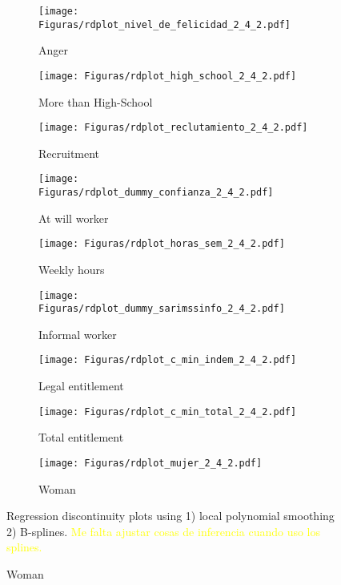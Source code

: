 \begin{figure}[H]
     \caption{RD plots (Calculator treatment; running variable : Tenure \& Daily wage)}
    \label{rd_covs_2_4_t2}
\begin{center}
\begin{subfigure}{0.31\textwidth}
\caption{Anger}
        \texttt{[image: Figuras/rdplot\_nivel\_de\_felicidad\_2\_4\_2.pdf]}
    \end{subfigure}
    \begin{subfigure}{0.31\textwidth}
\caption{More than High-School}
        \texttt{[image: Figuras/rdplot\_high\_school\_2\_4\_2.pdf]}
    \end{subfigure}
\begin{subfigure}{0.31\textwidth}
\caption{Recruitment}
        \texttt{[image: Figuras/rdplot\_reclutamiento\_2\_4\_2.pdf]}
    \end{subfigure}
    \begin{subfigure}{0.31\textwidth}
\caption{At will worker}
        \texttt{[image: Figuras/rdplot\_dummy\_confianza\_2\_4\_2.pdf]}
    \end{subfigure}        
    \begin{subfigure}{0.31\textwidth}
\caption{Weekly hours}
        \texttt{[image: Figuras/rdplot\_horas\_sem\_2\_4\_2.pdf]}
    \end{subfigure}    
    \begin{subfigure}{0.31\textwidth}
\caption{Informal worker}
        \texttt{[image: Figuras/rdplot\_dummy\_sarimssinfo\_2\_4\_2.pdf]}
    \end{subfigure}       
\begin{subfigure}{0.31\textwidth}
\caption{Legal entitlement}
        \texttt{[image: Figuras/rdplot\_c\_min\_indem\_2\_4\_2.pdf]}
    \end{subfigure}
    \begin{subfigure}{0.31\textwidth}
\caption{Total entitlement}
        \texttt{[image: Figuras/rdplot\_c\_min\_total\_2\_4\_2.pdf]}
    \end{subfigure}        
\begin{subfigure}{0.31\textwidth}
\caption{Woman}
        \texttt{[image: Figuras/rdplot\_mujer\_2\_4\_2.pdf]}
    \end{subfigure}
  \end{center}
  
    \scriptsize Regression discontinuity plots using 1) local polynomial smoothing 2) B-splines. \textcolor{yellow}{Me falta ajustar cosas de inferencia cuando uso los splines.}
\end{figure}


